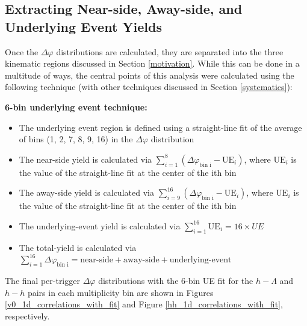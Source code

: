 \documentclass[ALICE,manyauthors]{ALICE_analysis_notes}
\begin{document}
\subsection{Extracting Near-side, Away-side, and Underlying Event Yields}
\label{yield_extraction}

Once the $\Delta\varphi$ distributions are calculated, they are separated into the three kinematic regions discussed in Section \ref{motivation}. While this can be done in a multitude of ways, the central points of this analysis were calculated using the following technique (with other techniques discussed in Section \ref{systematics}):

\textbf{6-bin underlying event technique:}
\begin{itemize}
\item The underlying event region is defined using a straight-line fit of the average of bins (1, 2, 7, 8, 9, 16) in the $\Delta\varphi$ distribution
\item The near-side yield is calculated via $\sum_{i=1}^{8} (\Delta\varphi_\text{bin i} - \text{UE}_i)$, where $\text{UE}_i$ is the value of the straight-line fit at the center of the ith bin
\item The away-side yield is calculated via $\sum_{i=9}^{16} (\Delta\varphi_\text{bin i} - \text{UE}_i)$, where $\text{UE}_i$ is the value of the straight-line fit at the center of the ith bin
\item The underlying-event yield is calculated via $\sum_{i=1}^{16} \text{UE}_i = 16 \times UE$
\item The total-yield is calculated via $\sum_{i=1}^{16} \Delta\varphi_\text{bin i} = \text{near-side} + \text{away-side} + \text{underlying-event}$
\end{itemize}

The final per-trigger $\Delta\varphi$ distributions with the 6-bin UE fit for the $h-\Lambda$ and $h-h$ pairs in each multiplicity bin are shown in Figures \ref{v0_1d_correlations_with_fit} and Figure \ref{hh_1d_correlations_with_fit}, respectively. 
\end{document}
